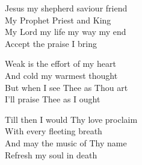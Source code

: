 \documentclass{beamer}
\begin{document}
{\begin{frame}{}
\end{frame}

\hypertarget{How sweet the name of Jesus sounds[]4}{}
\begin{frame}{}
\fontsize{ 18 }{ 23 }\selectfont

Jesus my shepherd saviour friend\\ 
My Prophet Priest and King\\ 
My Lord my life my way my end\\ 
Accept the praise I bring 

\end{frame}

\hypertarget{How sweet the name of Jesus sounds[]5}{}
\begin{frame}{}
\fontsize{ 18 }{ 23 }\selectfont

Weak is the effort of my heart\\ 
And cold my warmest thought\\ 
But when I see Thee as Thou art\\ 
I'll praise Thee as I ought 

\end{frame}

\hypertarget{How sweet the name of Jesus sounds[]6}{}
\begin{frame}{}
\fontsize{ 18 }{ 23 }\selectfont

Till then I would Thy love proclaim\\ 
With every fleeting breath\\ 
And may the music of Thy name\\ 
Refresh my soul in death 

\end{frame}

}
\end{document}
